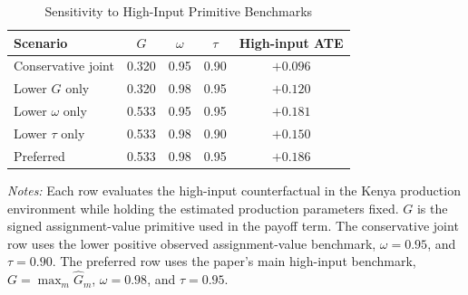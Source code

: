 \begin{table}[H]
\centering
\caption{Sensitivity to High-Input Primitive Benchmarks}
\label{tab:struct_primitive_sensitivity}
\begin{threeparttable}
\begin{tabular}[t]{lcccc}
\toprule
Scenario & $G$ & $\omega$ & $\tau$ & High-input ATE \\
\midrule
Conservative joint & 0.320 & 0.95 & 0.90 & $+0.096$ \\
Lower $G$ only & 0.320 & 0.98 & 0.95 & $+0.120$ \\
Lower $\omega$ only & 0.533 & 0.95 & 0.95 & $+0.181$ \\
Lower $\tau$ only & 0.533 & 0.98 & 0.90 & $+0.150$ \\
Preferred & 0.533 & 0.98 & 0.95 & $+0.186$ \\
\bottomrule
\end{tabular}
\begin{tablenotes}
\footnotesize
\item \textit{Notes:} Each row evaluates the high-input counterfactual in the Kenya production environment while holding the estimated production parameters fixed. $G$ is the signed assignment-value primitive used in the payoff term. The conservative joint row uses the lower positive observed assignment-value benchmark, $\omega=0.95$, and $\tau=0.90$. The preferred row uses the paper's main high-input benchmark, $G=\max_m \hat{G}_m$, $\omega=0.98$, and $\tau=0.95$.
\end{tablenotes}
\end{threeparttable}
\end{table}
